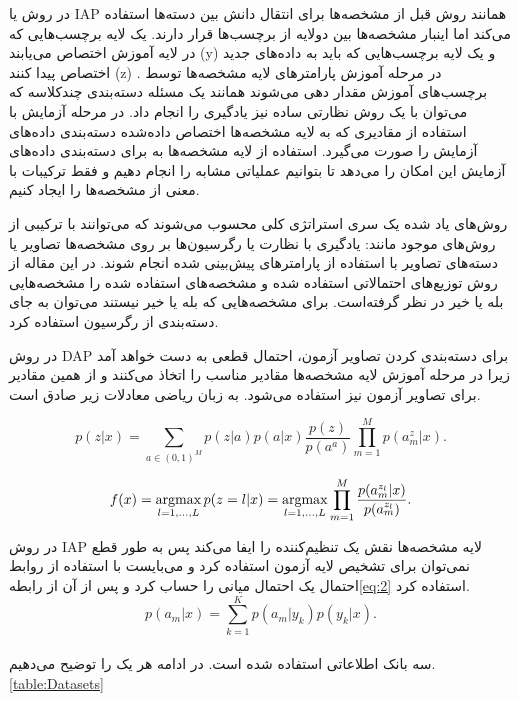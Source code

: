 در روش
یا IAP همانند روش قبل از مشخصه‌ها برای انتقال دانش بین دسته‌ها استفاده می‌کند اما اینبار مشخصه‌ها بین دولایه از برچسب‌ها قرار دارند. یک لایه برچسب‌هایی که در لایه آموزش اختصاص می‌یابند (y) و یک لایه برچسب‌هایی که باید به داده‌های جدید اختصاص پیدا کنند (z) . در مرحله آموزش پارامتر‌های لایه مشخصه‌ها توسط برچسب‌های آموزش مقدار دهی می‌شوند همانند یک مسئله دسته‌بندی چند‌کلاسه که می‌توان با یک روش نظارتی ساده نیز یادگیری را انجام داد. در مرحله آزمایش با استفاده از مقادیری که به لایه مشخصه‌ها اختصاص داده‌شده دسته‌بندی داده‌های آزمایش را صورت می‌گیرد. استفاده از لایه مشخصه‌ها به برای دسته‌بندی داده‌های آزمایش این امکان را می‌دهد تا بتوانیم عملیاتی مشابه
را انجام دهیم و فقط ترکیبات با معنی از مشخصه‌ها را ایجاد کنیم.

روش‌های یاد شده یک سری استراتژی کلی محسوب می‌شوند که می‌توانند با ترکیبی از روش‌‌های موجود مانند: یادگیری با نظارت یا رگرسیون‌ها بر روی مشخصه‌ها تصاویر یا دسته‌های تصاویر با استفاده از پارامتر‌های پیش‌بینی شده انجام شوند. در این مقاله از روش توزیع‌های احتمالاتی استفاده شده و مشخصه‌های استفاده شده را مشخصه‌هایی بله یا خیر در نظر گرفته‌است. برای مشخصه‌هایی که بله یا خیر نیستند می‌توان به جای دسته‌بندی از رگرسیون استفاده کرد.

در روش DAP برای دسته‌بندی کردن تصاویر آزمون، احتمال قطعی به دست خواهد آمد زیرا در مرحله آموزش لایه مشخصه‌ها مقادیر مناسب را اتخاذ می‌کنند و از همین مقادیر برای تصاویر آزمون نیز استفاده می‌شود. به زبان ریاضی معادلات زیر صادق است.


\begin{equation}
    p(z|x) = \sum_{a\in(0,1)^{M}} p(z|a)p(a|x)\dfrac{p(z)}{p(a^{a})}\prod_{m=1}^{M} p(a_{m}^{z}|x).
\end{equation}

\begin{equation}
    f(x) = \operatorname*{argmax}\limits_{l=1,...,L} p(z=l|x) = \operatorname*{argmax}\limits_{l=1,...,L} \prod_{m=1}^{M} \dfrac{p(a_{m}^{z_{l}}|x)}{p(a_{m}^{z_{l}})}.
    \label{eq:2}
\end{equation}

در روش IAP لایه مشخصه‌ها نقش یک تنظیم‌کننده را ایفا می‌کند پس به طور قطع نمی‌توان برای تشخیص لایه آزمون استفاده کرد و می‌بایست با استفاده از روابط احتمال یک احتمال میانی را حساب کرد و پس از آن از رابطه\ref{eq:2}
استفاده کرد.
\begin{equation}
    p(a_{m}|x) = \sum_{k=1}^{K} p(a_{m}|y_{k})p(y_{k}|x).
\end{equation}
\\
سه بانک اطلاعاتی استفاده شده است. در ادامه هر یک را توضیح می‌دهیم.\ref{table:Datasets}

